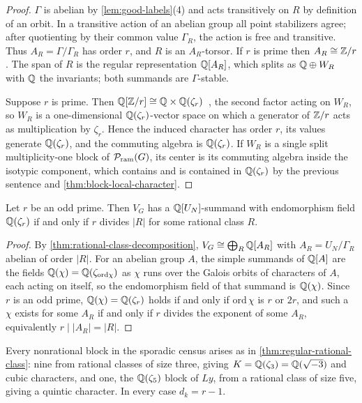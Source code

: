 \begin{proof}
\(\Gamma\) is abelian by \cref{lem:good-labels}(4) and acts transitively on
\(R\) by definition of an orbit.  In a transitive action of an abelian group
all point stabilizers agree; after quotienting by their common value
\(\Gamma_R\), the action is free and transitive.  Thus
\(A_R=\Gamma/\Gamma_R\) has order \(r\), and \(R\) is an \(A_R\)-torsor.
If \(r\) is prime then \(A_R\cong\mathbb Z/r\).  The span of \(R\) is the regular
representation \(\mathbb Q[A_R]\), which splits as \(\mathbb Q\oplus W_R\) with \(\mathbb Q\) the
invariants; both summands are \(\Gamma\)-stable.

Suppose \(r\) is prime.  Then \(\mathbb Q[\mathbb Z/r]\cong\mathbb Q\times\mathbb Q(\zeta_r)\)~\cite{Washington}, the
second factor acting on \(W_R\), so \(W_R\) is a one-dimensional
\(\mathbb Q(\zeta_r)\)-vector space on which a generator of \(\mathbb Z/r\) acts as
multiplication by \(\zeta_r\).  Hence the induced character has order
\(r\), its values generate \(\mathbb Q(\zeta_r)\), and the commuting algebra is
\(\mathbb Q(\zeta_r)\).  If \(W_R\) is a single split multiplicity-one block of
\(\mathcal P_{\mathrm{ram}}(G)\), its center is its commuting algebra inside the isotypic
component, which contains and is contained in \(\mathbb Q(\zeta_r)\) by the previous
sentence and \cref{thm:block-local-character}.
\end{proof}

\begin{corollary}
\label{cor:orbit-divisibility}
Let \(r\) be an odd prime.  Then \(V_G\) has a \(\mathbb Q[U_N]\)-summand with
endomorphism field \(\mathbb Q(\zeta_r)\) if and only if \(r\) divides \(|R|\) for
some rational class \(R\).
\end{corollary}

\begin{proof}
By \cref{thm:rational-class-decomposition},
\(V_G\cong\bigoplus_R\mathbb Q[A_R]\) with \(A_R=U_N/\Gamma_R\) abelian of order
\(|R|\).  For an abelian group \(A\), the simple summands of \(\mathbb Q[A]\) are the
fields \(\mathbb Q(\chi)=\mathbb Q(\zeta_{\mathrm{ord}\chi})\) as \(\chi\) runs over the
Galois orbits of characters of \(A\), each acting on itself, so the
endomorphism field of that summand is \(\mathbb Q(\chi)\).  Since \(r\) is an odd
prime, \(\mathbb Q(\chi)=\mathbb Q(\zeta_r)\) holds if and only if
\(\mathrm{ord}\,\chi\) is
\(r\) or \(2r\), and such a \(\chi\) exists for some \(A_R\) if and only if
\(r\) divides the exponent of some \(A_R\), equivalently \(r\mid|A_R|=|R|\).
\end{proof}

\begin{corollary}
\label{cor:nonrational-from-orbits}
Every nonrational block in the sporadic census arises as in
\cref{thm:regular-rational-class}: nine from rational classes of size three,
giving \(K=\mathbb Q(\zeta_3)=\mathbb Q(\sqrt{-3})\) and cubic characters, and one, the
\(\mathbb Q(\zeta_5)\) block of \(Ly\), from a rational class of size five, giving a
quintic character.  In every case \(d_k=r-1\).
\end{corollary}

